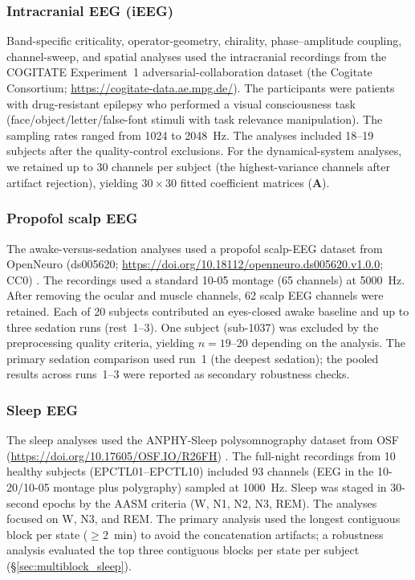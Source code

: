 \documentclass[preprint,12pt,nonatbib]{elsarticle}
\begin{document}
\subsubsection{Intracranial EEG (iEEG)}
Band-specific criticality, operator-geometry, chirality, phase--amplitude coupling, channel-sweep, and spatial analyses used the intracranial recordings from the COGITATE Experiment~1 adversarial-collaboration dataset \citep{Melloni2023} (the Cogitate Consortium; \url{https://cogitate-data.ae.mpg.de/}). The participants were patients with drug-resistant epilepsy who performed a visual consciousness task (face/object/letter/false-font stimuli with task relevance manipulation). The sampling rates ranged from 1024 to 2048~Hz. The analyses included 18--19 subjects after the quality-control exclusions. For the dynamical-system analyses, we retained up to 30 channels per subject (the highest-variance channels after artifact rejection), yielding $30\times30$ fitted coefficient matrices ($\hat{\mathbf{A}}$).

\subsubsection{Propofol scalp EEG}
The awake-versus-sedation analyses used a propofol scalp-EEG dataset from OpenNeuro (ds005620; \url{https://doi.org/10.18112/openneuro.ds005620.v1.0.0}; CC0) \citep{Maschke2024}. The recordings used a standard 10-05 montage (65 channels) at 5000~Hz. After removing the ocular and muscle channels, 62 scalp EEG channels were retained. Each of 20 subjects contributed an eyes-closed awake baseline and up to three sedation runs (rest~1--3). One subject (sub-1037) was excluded by the preprocessing quality criteria, yielding $n=19$--20 depending on the analysis. The primary sedation comparison used run~1 (the deepest sedation); the pooled results across runs~1--3 were reported as secondary robustness checks.

\subsubsection{Sleep EEG}
The sleep analyses used the ANPHY-Sleep polysomnography dataset from OSF (\url{https://doi.org/10.17605/OSF.IO/R26FH}) \citep{ANPHYSleepOSF}. The full-night recordings from 10 healthy subjects (EPCTL01--EPCTL10) included 93 channels (EEG in the 10-20/10-05 montage plus polygraphy) sampled at 1000~Hz. Sleep was staged in 30-second epochs by the AASM criteria (W, N1, N2, N3, REM). The analyses focused on W, N3, and REM. The primary analysis used the longest contiguous block per state ($\geq$2~min) to avoid the concatenation artifacts; a robustness analysis evaluated the top three contiguous blocks per state per subject (\S\ref{sec:multiblock_sleep}).
\end{document}
